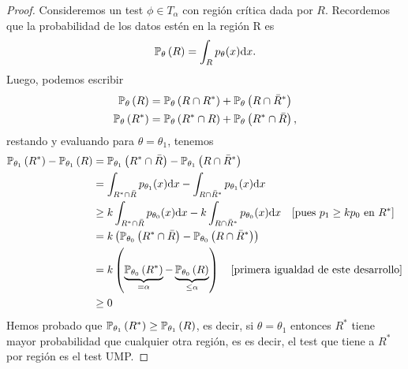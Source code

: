 \begin{proof}
	Consideremos un test $\phi\in T_\alpha$ con región crítica dada por $R$. Recordemos que  la probabilidad de los datos estén en la región R es 
	\begin{equation}
		\mathbb{P}_\theta \left(R\right) = \int_R p_\theta(x){\text{d}x}.
	\end{equation}
	Luego, podemos escribir 
	\begin{align}
		\mathbb{P}_\theta \left(R\right) &= \mathbb{P}_\theta \left(R\cap R^*\right) + \mathbb{P}_\theta \left(R\cap \bar{R}^*\right)\\
		\mathbb{P}_\theta \left(R^*\right) &= \mathbb{P}_\theta \left(R^*\cap R\right) + \mathbb{P}_\theta \left(R^*\cap \bar{R}\right),
	\end{align}
	restando y evaluando para $\theta=\theta_1$, tenemos
	\begin{align}
	\mathbb{P}_{\theta_1} \left(R^*\right) - \mathbb{P}_{\theta_1} \left(R\right) 	&=  \mathbb{P}_{\theta_1} \left(R^*\cap \bar{R}\right) - \mathbb{P}_{\theta_1} \left(R\cap \bar{R}^*\right)\nonumber \\
								&=  \int_{R^*\cap \bar{R}} p_{\theta_1}(x){\text{d}x} - \int_{R\cap \bar{R}^*} p_{\theta_1}(x){\text{d}x}\nonumber\\
									&\geq  k\int_{R^*\cap \bar{R}} p_{\theta_0}(x){\text{d}x} - k\int_{R\cap \bar{R}^*} p_{\theta_0}(x){\text{d}x} \quad[\text{pues } p_1\geq k p_0 \text{ en } R^*]\nonumber\\
									&= k\left( \mathbb{P}_{\theta_0} \left(R^*\cap \bar{R}\right) - \mathbb{P}_{\theta_0} \left(R\cap \bar{R}^*\right)\right)\nonumber \\
									&= k\left( \underbrace{\mathbb{P}_{\theta_0} \left(R^*\right)}_{=\alpha} - \underbrace{\mathbb{P}_{\theta_0} \left(R\right)}_{\leq\alpha}\right) \quad[\text{primera igualdad de este desarrollo}]\nonumber\\
									&\geq 0
	\end{align}
	Hemos probado que $\mathbb{P}_{\theta_1} \left(R^*\right) \geq \mathbb{P}_{\theta_1} \left(R\right)$, es decir, si $\theta = \theta_1$ entonces $R^*$ tiene mayor probabilidad que cualquier otra región, es es decir, el test que tiene a $R^*$ por región es el test UMP.

	
\end{proof}


